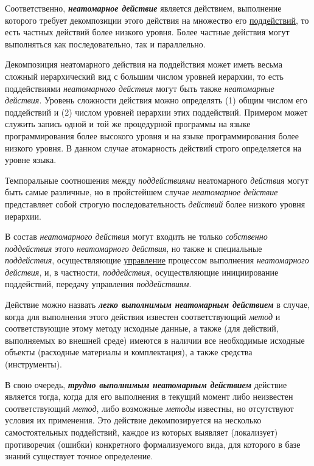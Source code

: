 Соответственно, \textbf{\textit{неатомарное действие}} является действием, выполнение которого требует декомпозиции этого действия на множество его \uline{поддействий}, то есть частных действий более низкого уровня. Более частные действия могут выполняться как последовательно, так и параллельно.

Декомпозиция неатомарного действия на поддействия может иметь весьма сложный иерархический вид с большим числом уровней иерархии, то есть поддействиями \textit{неатомарного действия} могут быть также \textit{неатомарные действия}. Уровень сложности действия можно определять (1) общим числом его поддействий и (2) числом уровней иерархии этих поддействий. Примером может служить запись одной и той же процедурной программы на языке программирования более высокого уровня и на языке программирования более низкого уровня. В данном случае атомарность действий строго определяется на уровне языка.

Темпоральные соотношения между \textit{поддействиями} неатомарного \textit{действия} могут быть самые различные, но в пройстейшем случае \textit{неатомарное действие} представляет собой строгую последовательность \textit{действий} более низкого уровня иерархии.

В состав \textit{неатомарного действия} могут входить не только \textit{собственно поддействия} этого \textit{неатомарного действия}, но также и специальные \textit{поддействия}, осуществляющие \uline{управление} процессом выполнения \textit{неатомарного действия}, и, в частности, \textit{поддействия}, осуществляющие инициирование поддействий, передачу управления \textit{поддействиям}.

Действие можно назвать \textbf{\textit{легко выполнимым неатомарным действием}} в случае, когда для выполнения этого действия известен соответствующий \textit{метод} и соответствующие этому методу исходные данные, а также (для действий, выполняемых во внешней среде) имеются в наличии все необходимые исходные объекты (расходные материалы и комплектация), а также средства (инструменты).

В свою очередь, \textbf{\textit{трудно выполнимым неатомарным действием}} действие является тогда, когда для его выполнения в текущий момент либо неизвестен соответствующий \textit{метод}, либо возможные \textit{методы} известны, но отсутствуют условия их применения. Это действие декомпозируется на несколько самостоятельных поддействий, каждое из которых выявляет (локализует) противоречия (ошибки) конкретного формализуемого вида, для которого в базе знаний существует точное определение.

